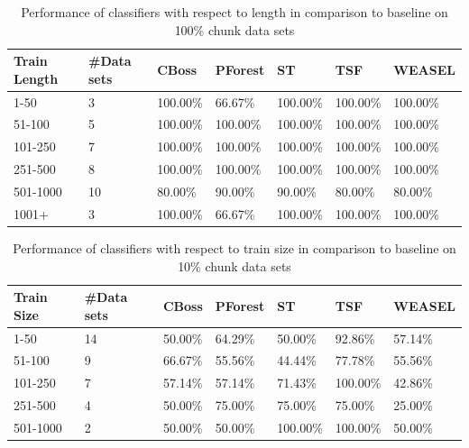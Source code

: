         \begin{table}[!ht]
            \setlength\extrarowheight{2pt} %
            \begin{tabularx}{\textwidth}{|X|X|X|X|X|X|X|}
            \hline
            \textbf{Train Length} & \textbf{\#Data sets} & \textbf{CBoss} & \textbf{PForest} & \textbf{ST} & \textbf{TSF} & \textbf{WEASEL} \\ \hline
                1-50 & 3 & 100.00\% & 66.67\% & 100.00\% & 100.00\% & 100.00\% \\ \hline
                51-100 & 5 & 100.00\% & 100.00\% & 100.00\% & 100.00\% & 100.00\% \\ \hline
                101-250 & 7 & 100.00\% & 100.00\% & 100.00\% & 100.00\% & 100.00\% \\ \hline
                251-500 & 8 & 100.00\% & 100.00\% & 100.00\% & 100.00\% & 100.00\% \\ \hline
                501-1000 & 10 &80.00\% & 90.00\% & 90.00\% & 80.00\% & 80.00\% \\ \hline
                1001+ & 3 & 100.00\% & 66.67\% & 100.00\% & 100.00\% & 100.00\% \\ \hline
            \end{tabularx}
            \caption{Performance of classifiers with respect to length in comparison to baseline on 100\% chunk data sets}
        \end{table}
    
        \begin{table}[!ht]
            \setlength\extrarowheight{2pt} %
            \begin{tabularx}{\textwidth}{|X|X|X|X|X|X|X|}
            \hline
            \textbf{Train Size} & \textbf{\#Data sets} & \textbf{CBoss} & \textbf{PForest} & \textbf{ST} & \textbf{TSF} & \textbf{WEASEL} \\ \hline
                1-50 & 14 & 50.00\% & 64.29\% & 50.00\% & 92.86\% & 57.14\% \\ \hline
                51-100 & 9 & 66.67\% & 55.56\% & 44.44\% & 77.78\% & 55.56\% \\ \hline
                101-250 & 7 & 57.14\% & 57.14\% & 71.43\% & 100.00\% & 42.86\% \\ \hline
                251-500 & 4 & 50.00\% & 75.00\% & 75.00\% & 75.00\% & 25.00\% \\ \hline
                501-1000 & 2 &50.00\% & 50.00\% & 100.00\% & 100.00\% & 50.00\% \\ \hline
            \end{tabularx}
            \caption{Performance of classifiers with respect to train size in comparison to baseline on 10\% chunk data sets}
        \end{table}
        
